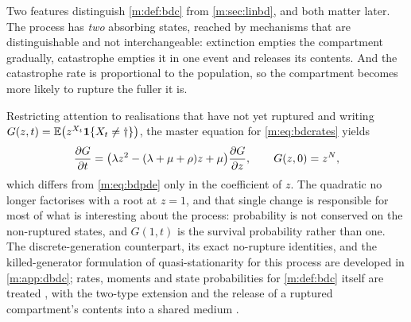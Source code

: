 Two features distinguish \cref{m:def:bdc} from \cref{m:sec:linbd}, and both
matter later. The process has \emph{two} absorbing states, reached by mechanisms
that are distinguishable and not interchangeable: extinction empties the
compartment gradually, catastrophe empties it in one event and releases its
contents. And the catastrophe rate is proportional to the population, so the
compartment becomes more likely to rupture the fuller it is.

Restricting attention to realisations that have not yet ruptured and writing
$G(z,t) = \mathbb{E}\!\left(z^{X_t}\mathbf{1}\{X_t\neq\dagger\}\right)$, the master equation for
\cref{m:eq:bdcrates} yields
\begin{equation}
\label{m:eq:bdcpde}
\frac{\partial G}{\partial t} = \bigl(\lambda z^2-(\lambda+\mu+\rho)z+\mu\bigr)\frac{\partial G}{\partial z},
\qquad G(z,0) = z^{N},
\end{equation}
which differs from \cref{m:eq:bdpde} only in the coefficient of $z$. The
quadratic no longer factorises with a root at $z=1$, and that single change is
responsible for most of what is interesting about the process: probability is
not conserved on the non-ruptured states, and $G(1,t)$ is the survival
probability rather than one. The discrete-generation counterpart, its exact
no-rupture identities, and the killed-generator formulation of
quasi-stationarity for this process are developed in \cref{m:app:dbdc}; rates,
moments and state probabilities for \cref{m:def:bdc} itself are treated
, with
the two-type extension 
and the release of a ruptured compartment's contents into a shared medium
.

\FloatBarrier
